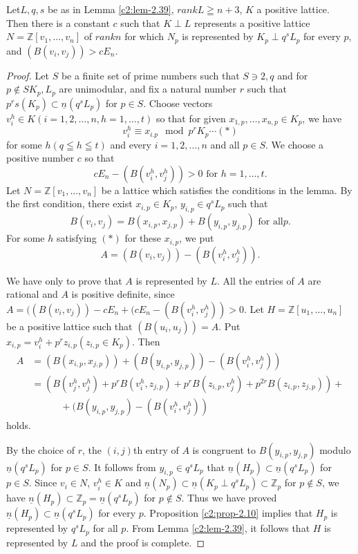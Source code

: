 \begin{lemma}\label{c2:lem-2.40}
Let\pageoriginale $L,q,s$ be as in Lemma \ref{c2:lem-2.39}, $rank L \geqq n + 3$,
$K$ a positive lattice. Then there is a constant $c$ such that $K\perp
L$ represents a positive lattice $N=\mathbb{Z}[v_1, \ldots, v_n]$ of
$rank n$ for which $N_p$ is represented by $K_p \perp q^s L_p$ for
every $p$, and $(B(v_i, v_j)) > c E_n$.
\end{lemma}

\begin{proof}
Let $S$ be a finite set of prime numbers such that $S\ni 2, q$ and for
$p\not\in S K_p, L_p$ are unimodular, and fix a natural number $r$
such that $p^rs(K_p) \subset \underline{n} (q^sL_p)$ for
$p \in S$. Choose vectors $v^h_i \in K(i=1,2, \ldots,
n, h=1, \ldots, t)$ so that for given $x_{1,p}, \ldots,
x_{n,p} \in K_p$, we have     
$$
v^h_i \equiv x_{i.p} \mod p^r K_p \cdots (\ast)
$$
for some $h(q\leqq h \leqq t)$ and every $i=1,2,\ldots, n$ and all
$p\in S$. We choose a positive number $c$ so that 
$$
cE_n -(B(v^h_i, v^h_j)) >0 \text{ for } h =1, \ldots, t.
$$
Let $N=\mathbb{Z}[v_1,\ldots, v_n]$ be a lattice which satisfies the
conditions in the lemma. By the first condition, there exist
$x_{i,p} \in K_p$, $y_{i,p} \in q^s L_p$ such that 
$$
B(v_i, v_j) = B(x_{i,p}, x_{j,p}) + B(y_{i,p}, y_{j,p}) \text{ for all
} p.
$$
For some $h$ satisfying $(\ast)$ for these $x_{i,p}$, we put 
$$
A=(B(v_i, v_j)) - (B(v^h_i, v^h_j)).
$$

We have only to prove that $A$ is represented by $L$. All the entries
of $A$ are rational and $A$ is positive definite, since $A=((B(v_i,
v_j)) -cE_n+(cE_n-(B(v^h_i, v^h_j))>0$. Let\pageoriginale
$H=\mathbb{Z}[u_1, \ldots, u_n]$ be a positive lattice such that
$(B(u_i, u_j))=A$. Put $x_{i,p} =v^h_i+ p^rz_{i,p}(z_{i,p}\in
K_p)$. Then 
\begin{align*}
A & = (B(x_{i,p}, x_{j,p})) + (B(y_{i,p}, y_{j,p})) - (B(v^h_i,
v^h_j))\\
& = (B(v^h_j, v^h_j) + p^r B(v^h_i, z_{j,p}) + p^r B(z_{i,p}, v^h_j) +
 p^{2r}B(z_{i,p}, z_{j,p})) +\\
& \qquad \quad + (B(y_{i,p}, y_{j,p}) -(B(v^h_i, v^h_j))
\end{align*}
holds.

By the choice of $r$, the $(i,j)$th entry of $A$ is congruent to
$B(y_{i,p}, y_{j,p})$ modulo $\underline{n}(q^sL_p)$ for $p\in
S$. It follows from $y_{i,p} \in q^s L_p$ that
$\underline{n}(H_p) \subset \underline{n} (q^s L_p)$ for $p\in
S$. Since $v_i \in N$, $v^h_i \in K$ and
$\underline{n}(N_p) \subset \underline{n} (K_p\perp q^s
L_p) \subset \mathbb{Z}_p$ for $p\not\in S$, we have
$\underline{n}(H_p) \subset \mathbb{Z}_p =\underline{n}(q^sL_p)$ for
$p\not\in S$. Thus we have proved
$\underline{n}(H_p) \subset \underline{n} (q^sL_p)$ for every
$p$. Proposition \ref{c2:prop-2.10} implies that $H_p$ is represented by $q^sL_p$
for all $p$. From Lemma \ref{c2:lem-2.39}, it follows that $H$ is represented by
$L$ and the proof is complete.
\end{proof}

